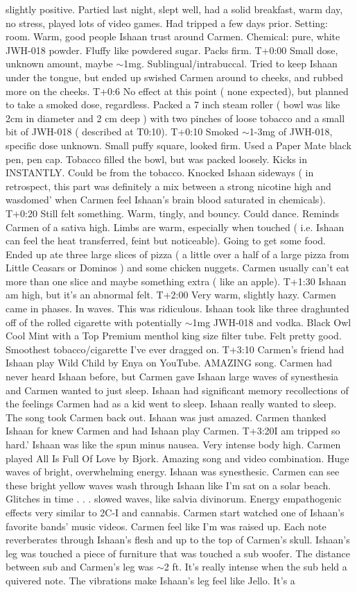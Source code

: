 \documentclass[12pt]{book}
\begin{document}
slightly positive. Partied last night, slept well, had a solid breakfast, warm day, no stress, played lots of video games. Had tripped a few days prior. Setting: room. Warm, good people Ishaan trust around Carmen. Chemical: pure, white JWH-018 powder. Fluffy like powdered sugar. Packs firm. T+0:00 Small dose, unknown amount, maybe $\sim$1mg. Sublingual/intrabuccal. Tried to keep Ishaan under the tongue, but ended up swished Carmen around to cheeks, and rubbed more on the cheeks. T+0:6 No effect at this point ( none expected), but planned to take a smoked dose, regardless. Packed a 7 inch steam roller ( bowl was like 2cm in diameter and 2 cm deep ) with two pinches of loose tobacco and a small bit of JWH-018 ( described at T0:10). T+0:10 Smoked $\sim$1-3mg of JWH-018, specific dose unknown. Small puffy square, looked firm. Used a Paper Mate black pen, pen cap. Tobacco filled the bowl, but was packed loosely. Kicks in INSTANTLY. Could be from the tobacco. Knocked Ishaan sideways ( in retrospect, this part was definitely a mix between a strong nicotine high and wasdomed' when Carmen feel Ishaan's brain blood saturated in chemicals). T+0:20 Still felt something. Warm, tingly, and bouncy. Could dance. Reminds Carmen of a sativa high. Limbs are warm, especially when touched ( i.e. Ishaan can feel the heat transferred, feint but noticeable). Going to get some food. Ended up ate three large slices of pizza ( a little over a half of a large pizza from Little Ceasars or Dominos ) and some chicken nuggets. Carmen usually can't eat more than one slice and maybe something extra ( like an apple). T+1:30 Ishaan am high, but it's an abnormal felt. T+2:00 Very warm, slightly hazy. Carmen came in phases. In waves. This was ridiculous. Ishaan took like three draghunted off of the rolled cigarette with potentially $\sim$1mg JWH-018 and vodka. Black Owl Cool Mint with a Top Premium menthol king size filter tube. Felt pretty good. Smoothest tobacco/cigarette I've ever dragged on. T+3:10 Carmen's friend had Ishaan play Wild Child by Enya on YouTube. AMAZING song. Carmen had never heard Ishaan before, but Carmen gave Ishaan large waves of synesthesia and Carmen wanted to just sleep. Ishaan had significant memory recollections of the feelings Carmen had as a kid went to sleep. Ishaan really wanted to sleep. The song took Carmen back out. Ishaan was just amazed. Carmen thanked Ishaan for knew Carmen and had Ishaan play Carmen. T+3:20I am tripped so hard.' Ishaan was like the spun minus nausea. Very intense body high. Carmen played All Is Full Of Love by Bjork. Amazing song and video combination. Huge waves of bright, overwhelming energy. Ishaan was synesthesic. Carmen can see these bright yellow waves wash through Ishaan like I'm sat on a solar beach. Glitches in time . . .  slowed waves, like salvia divinorum. Energy empathogenic effects very similar to 2C-I and cannabis. Carmen start watched one of Ishaan's favorite bands' music videos. Carmen feel like I'm was raised up. Each note reverberates through Ishaan's flesh and up to the top of Carmen's skull. Ishaan's leg was touched a piece of furniture that was touched a sub woofer. The distance between sub and Carmen's leg was $\sim$2 ft. It's really intense when the sub held a quivered note. The vibrations make Ishaan's leg feel like Jello. It's a 
\end{document}
